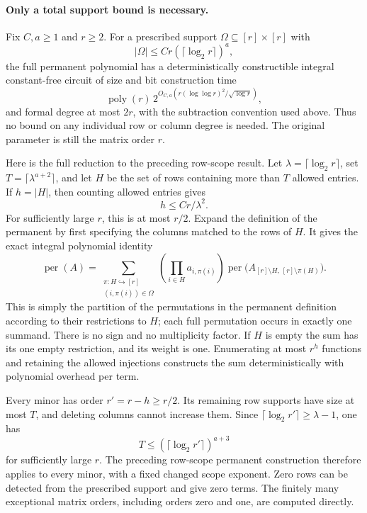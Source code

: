 \paragraph{Only a total support bound is necessary.}
Fix $C,a\ge1$ and $r\ge2$.  For a prescribed support
$\Omega\subseteq[r]\times[r]$ with
\[
                     |\Omega|\le Cr(\lceil\log_2r\rceil)^a,
\]
the full permanent polynomial has a deterministically
constructible integral constant-free circuit of size and
bit construction time
\[
 \operatorname{poly}(r)\,
       2^{O_{C,a}(r(\log\log r)^2/\sqrt{\log r})},
\]
and formal degree at most $2r$, with the subtraction convention
used above.  Thus no bound on any individual row or column
degree is needed.  The original parameter is still the
matrix order $r$.

Here is the full reduction to the preceding row-scope result.
Let $\lambda=\lceil\log_2r\rceil$, set
$T=\lceil\lambda^{a+2}\rceil$, and let $H$ be the set of
rows containing more than $T$ allowed entries.  If $h=|H|$,
then counting allowed entries gives
\[
                          h\le Cr/\lambda^2.
\]
For sufficiently large $r$, this is at most $r/2$.
Expand the definition of the permanent by first specifying
the columns matched to the rows of $H$.  It gives the exact
integral polynomial identity
\[
 \operatorname{per}(A)=
 \sum_{\substack{\pi:H\hookrightarrow[r]\\(i,\pi(i))\in\Omega}}
       \left(\prod_{i\in H}a_{i,\pi(i)}\right)
       \operatorname{per}\bigl(A_{[r]\setminus H,\,[r]\setminus\pi(H)}\bigr).
\]
This is simply the partition of the permutations in the
permanent definition according to their restrictions to
$H$; each full permutation occurs in exactly one summand.
There is no sign and no multiplicity factor.  If $H$ is
empty the sum has its one empty restriction, and its
weight is one.  Enumerating at most $r^h$ functions and
retaining the allowed injections constructs the sum
deterministically with polynomial overhead per term.

Every minor has order $r'=r-h\ge r/2$.  Its remaining
row supports have size at most $T$, and deleting columns
cannot increase them.  Since
$\lceil\log_2r'\rceil\ge\lambda-1$, one has
\[
                   T\le(\lceil\log_2r'\rceil)^{a+3}
\]
for sufficiently large $r$.  The preceding row-scope
permanent construction therefore applies to every minor,
with a fixed changed scope exponent.  Zero rows can be
detected from the prescribed support and give zero terms.
The finitely many exceptional matrix orders, including
orders zero and one, are computed directly.

